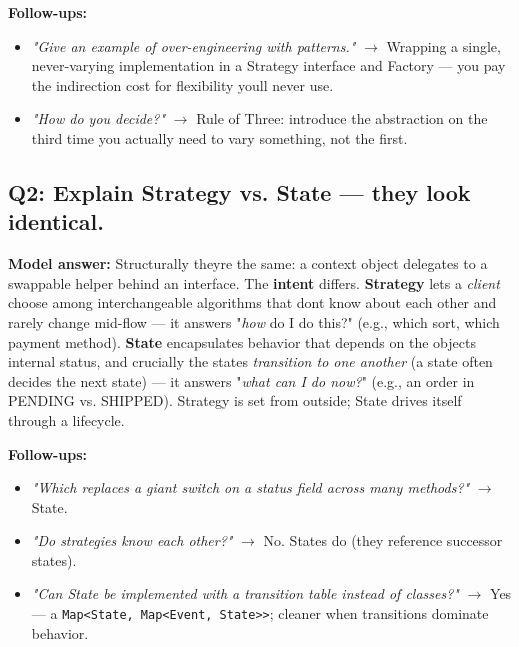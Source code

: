 \documentclass[11pt]{article}
\providecommand{\tightlist}{\setlength{\itemsep}{1pt}\setlength{\parskip}{0pt}}
\begin{document}
\textbf{Follow-ups:}

\begin{itemize}
\tightlist
\item
  \emph{"Give an example of over-engineering with patterns."} \(\rightarrow\) Wrapping a single, never-varying implementation in a Strategy interface and Factory --- you pay the indirection cost for flexibility you\textquotesingle ll never use.
\item
  \emph{"How do you decide?"} \(\rightarrow\) Rule of Three: introduce the abstraction on the third time you actually need to vary something, not the first.
\end{itemize}

\subsection{Q2: Explain Strategy vs. State --- they look identical.}\label{q2-explain-strategy-vs-state--they-look-identical}

\textbf{Model answer:} Structurally they\textquotesingle re the same: a context object delegates to a swappable helper behind an interface. The \textbf{intent} differs. \textbf{Strategy} lets a \emph{client} choose among interchangeable algorithms that don\textquotesingle t know about each other and rarely change mid-flow --- it answers "\emph{how} do I do this?" (e.g., which sort, which payment method). \textbf{State} encapsulates behavior that depends on the object\textquotesingle s internal status, and crucially the states \emph{transition to one another} (a state often decides the next state) --- it answers "\emph{what can I do now?}" (e.g., an order in PENDING vs. SHIPPED). Strategy is set from outside; State drives itself through a lifecycle.

\textbf{Follow-ups:}

\begin{itemize}
\tightlist
\item
  \emph{"Which replaces a giant switch on a status field across many methods?"} \(\rightarrow\) State.
\item
  \emph{"Do strategies know each other?"} \(\rightarrow\) No. States do (they reference successor states).
\item
  \emph{"Can State be implemented with a transition table instead of classes?"} \(\rightarrow\) Yes --- a \texttt{Map\textless{}State,\ Map\textless{}Event,\ State\textgreater{}\textgreater{}}; cleaner when transitions dominate behavior.
\end{itemize}
\end{document}
